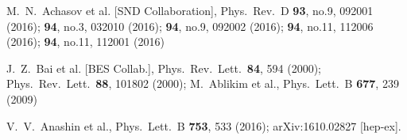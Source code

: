 \documentclass[epj,onecolumn]{webofc}
\begin{document}
\begin{thebibliography}{}
  M.~N.~Achasov et al. [SND Collaboration],
  Phys.\ Rev.\ D {\bf 93}, no.9,  092001 (2016);
%
{\bf 94}, no.3,  032010 (2016);
%
{\bf 94}, no.9,  092002 (2016);
%
{\bf 94}, no.11,  112006 (2016);
%
{\bf 94}, no.11,  112001 (2016)

J.~Z.~Bai et al.  [BES Collab.],
Phys.\ Rev.\ Lett.\  {\bf 84}, 594 (2000);
Phys.\ Rev.\ Lett.\  {\bf 88}, 101802 (2000);
  M.~Ablikim et al.,
  Phys.\ Lett.\ B {\bf 677}, 239 (2009)

  V.~V.~Anashin et al.,
  Phys.\ Lett.\ B {\bf 753}, 533 (2016);
%
  arXiv:1610.02827 [hep-ex].



\end{thebibliography}
\end{document}
